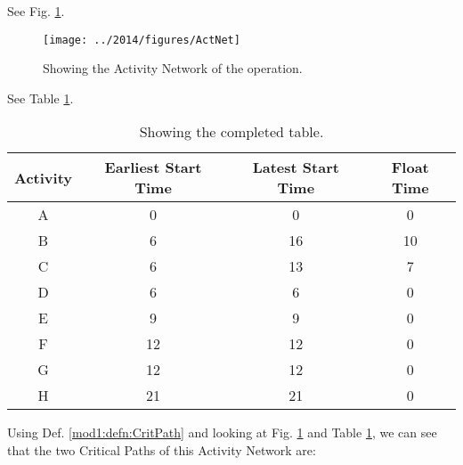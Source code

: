 %
%

\begin{subquestions}


\subquestion
\begin{subsubquestions}
	
\subsubquestion
See Fig. \ref{2014:q2:fig:ActNet}.

\begin{figure}
	\begin{center}
		\texttt{[image: ../2014/figures/ActNet]}
		\caption{\label{2014:q2:fig:ActNet} Showing the Activity Network of the operation.}
	\end{center}
\end{figure}

\subsubquestion

 See Table \ref{2014:tab:Act}. 
\begin{table}[ht]
	\centering
	\begin{tabular}{|c|c|c|c|}
		\hline
		Activity&Earliest Start Time&Latest Start Time&Float Time\\
		\hline
		A & 0 & 0 & 0 \\
		B & 6 & 16 & 10 \\
		C & 6 & 13 & 7 \\
		D & 6 & 6 & 0 \\
		E & 9 & 9 & 0 \\
		F & 12 & 12 & 0 \\
		G & 12 & 12 & 0 \\
		H & 21 & 21 & 0  \\
		\hline
		
	\end{tabular}
\caption{\label{2014:tab:Act} Showing the completed table.}
\end{table}

\subsubquestion

Using Def. \ref{mod1:defn:CritPath} and looking at Fig. \ref{2014:q2:fig:ActNet} and Table \ref{2014:tab:Act}, we can see that the two Critical Paths of this Activity Network are:


\end{subsubquestions}
\end{subquestions}
